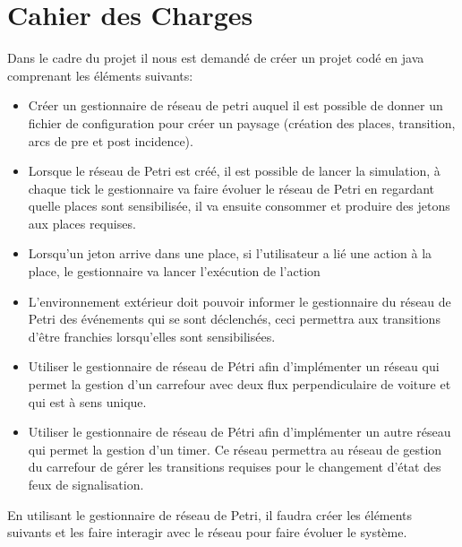 \chapter{Cahier des Charges}

Dans le cadre du projet il nous est demandé de créer un projet codé en java comprenant les éléments suivants:
\begin{itemize}
\item Créer un gestionnaire de réseau de petri auquel il est possible de donner un fichier de configuration pour créer un paysage (création des places, transition, arcs de pre et post incidence).
\item Lorsque le réseau de Petri est créé, il est possible de lancer la simulation, à chaque tick le gestionnaire va faire évoluer le réseau de Petri en regardant quelle places sont sensibilisée, il va ensuite consommer et produire des jetons aux places requises.
\item Lorsqu'un jeton arrive dans une place, si l'utilisateur a lié une action à la place, le gestionnaire va lancer l'exécution de l'action
\item L'environnement extérieur doit pouvoir informer le gestionnaire du réseau de Petri des événements qui se sont déclenchés, ceci permettra aux transitions d'être franchies lorsqu'elles sont sensibilisées.
\item Utiliser le gestionnaire de réseau de Pétri afin d'implémenter un réseau qui permet la gestion d'un carrefour avec deux flux perpendiculaire de voiture et qui est à sens unique.
\item Utiliser le gestionnaire de réseau de Pétri afin d'implémenter un autre réseau qui permet la gestion d'un timer. Ce réseau permettra au réseau de gestion du carrefour de gérer les transitions requises pour le changement d'état des feux de signalisation.
\end{itemize}

En utilisant le gestionnaire de réseau de Petri, il faudra créer les éléments suivants et les faire interagir avec le réseau pour faire évoluer le système.

